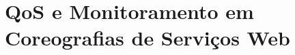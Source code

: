 \documentclass[xcolor=svgnames]{beamer}
\begin{document}

\section{QoS e Monitoramento em Coreografias de Serviços Web }
\end{document}
